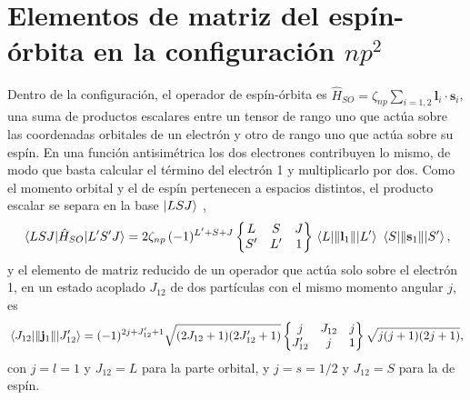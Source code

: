\section{Elementos de matriz del espín-órbita en la configuración \texorpdfstring{$np^2$}{np2}}
\label{sec:so_racah}

Dentro de la configuración, el operador de espín-órbita es $\hat{H}_{SO} = \zeta_{np}\sum_{i=1,2}\mathbf{l}_i\cdot\mathbf{s}_i$, una suma de productos escalares entre un tensor de rango uno que actúa sobre las coordenadas orbitales de un electrón y otro de rango uno que actúa sobre su espín. En una función antisimétrica los dos electrones contribuyen lo mismo, de modo que basta calcular el término del electrón 1 y multiplicarlo por dos. Como el momento orbital y el de espín pertenecen a espacios distintos, el producto escalar se separa en la base $\ket{LSJ}$ \parencite[Capítulo 7]{Edmonds1957},
\begin{equation}
  \label{eq:so_racah}
  \mel{LSJ}{\hat{H}_{SO}}{L'S'J} = 2\zeta_{np}\,(-1)^{L'+S+J}
  \begin{Bmatrix} L & S & J \\ S' & L' & 1 \end{Bmatrix}
  \mel{L}{\|\mathbf{l}_1\|}{L'}\,\mel{S}{\|\mathbf{s}_1\|}{S'} ,
\end{equation}
y el elemento de matriz reducido de un operador que actúa solo sobre el electrón 1, en un estado acoplado $J_{12}$ de dos partículas con el mismo momento angular $j$, es
\begin{equation}
  \label{eq:reducido_un_electron}
  \mel{J_{12}}{\|\mathbf{j}_1\|}{J'_{12}} = (-1)^{2j+J'_{12}+1}\sqrt{(2J_{12}+1)(2J'_{12}+1)}
  \begin{Bmatrix} j & J_{12} & j \\ J'_{12} & j & 1 \end{Bmatrix}\sqrt{j(j+1)(2j+1)} ,
\end{equation}
con $j = l = 1$ y $J_{12} = L$ para la parte orbital, y $j = s = 1/2$ y $J_{12} = S$ para la de espín.

